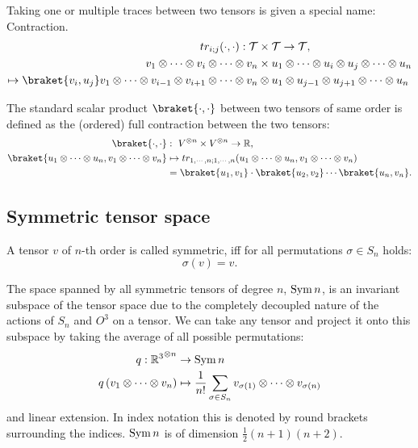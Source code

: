 {\begin{definition}
	Taking one or multiple traces between two tensors is given a special name: Contraction.
	\begin{align*}
		tr_{i;j} (\cdot,\cdot): \mathcal{T} &\times \mathcal{T} \to \mathcal{T},
		\\
		v_1 \otimes \cdots \otimes v_i \otimes \cdots\otimes v_n &\times u_1 \otimes \cdots \otimes u_i \otimes u_j \otimes \cdots \otimes u_n 
		\\
		\mapsto \braket{v_i,u_j} v_1 \otimes \cdots \otimes v_{i-1}\otimes v_{i+1} \otimes \cdots \otimes v_n &\otimes u_1 \otimes u_{j-1} \otimes u_{j+1} \otimes \cdots \otimes u_n
	\end{align*}
\end{definition}
\begin{definition}
	The standard scalar product $\braket{\cdot,\cdot}$ between two tensors of same order is defined as the (ordered) full contraction between the two tensors:
	\begin{align*}
		\braket{\cdot,\cdot} &: \  V^{\otimes n} \times V^{\otimes n} \to \IR,\\
		\braket{u_1 \otimes \cdots \otimes u_n,v_1 \otimes \cdots \otimes v_n} &\mapsto tr_{1,\cdots,n;1,\cdots,n} (u_1 \otimes \cdots \otimes u_n,v_1 \otimes \cdots \otimes v_n) \\
		&= \braket{u_1,v_1}\cdot\braket{u_2,v_2} \cdots \braket{u_n,v_n}.
	\end{align*}
\end{definition}
\subsection{Symmetric tensor space}
\begin{definition}
	A tensor $v$ of $n$-th order is called symmetric, iff for all permutations $\sigma \in S_n$ holds:
	\[\sigma(v) = v.\]
\end{definition}
The space spanned by all symmetric tensors of degree $n$, $\operatorname{Sym}{n}$, is an invariant subspace of the tensor space due to the completely decoupled nature of the actions of $S_n$ and $O^3$ on a tensor. We can take any tensor and project it onto this subspace by taking the average of all possible permutations:
\begin{align*}
	q: {\mathbb{R}^3}^{\otimes n} &\to \operatorname{Sym}{n}\\
	q\left(v_1 \otimes \cdots  \otimes v_n\right) &\mapsto \frac{1}{n!} \sum_{\sigma \in S_n} v_{\sigma(1)} \otimes \cdots \otimes v_{\sigma(n)}
\end{align*}
and linear extension. In index notation this is denoted by round brackets surrounding the indices. $\operatorname{Sym}{n}$ is of dimension $\frac{1}{2}(n+1)(n+2)$.

}
